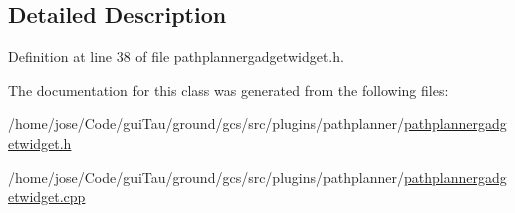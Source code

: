 \subsection{Detailed Description}


Definition at line 38 of file pathplannergadgetwidget.\-h.



The documentation for this class was generated from the following files\-:\begin{DoxyCompactItemize}
\item 
/home/jose/\-Code/gui\-Tau/ground/gcs/src/plugins/pathplanner/\hyperlink{pathplannergadgetwidget_8h}{pathplannergadgetwidget.\-h}\item 
/home/jose/\-Code/gui\-Tau/ground/gcs/src/plugins/pathplanner/\hyperlink{pathplannergadgetwidget_8cpp}{pathplannergadgetwidget.\-cpp}\end{DoxyCompactItemize}
